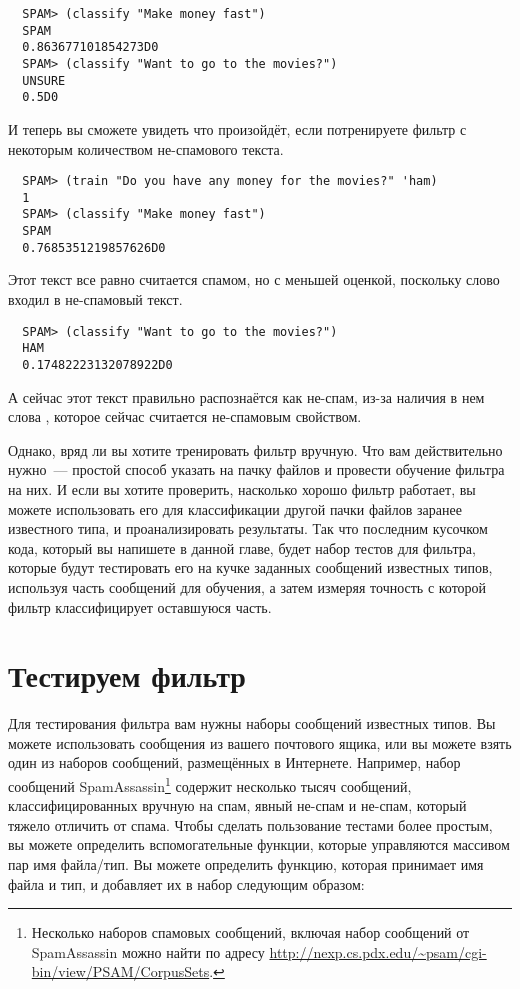 \begin{verbatim}
  SPAM> (classify "Make money fast")
  SPAM
  0.863677101854273D0
  SPAM> (classify "Want to go to the movies?")
  UNSURE
  0.5D0
\end{verbatim}

И теперь вы сможете увидеть что произойдёт, если потренируете фильтр с некоторым
количеством не-спамового текста.

\begin{verbatim}
  SPAM> (train "Do you have any money for the movies?" 'ham)
  1
  SPAM> (classify "Make money fast")
  SPAM
  0.7685351219857626D0
\end{verbatim}

Этот текст все равно считается спамом, но с меньшей оценкой, поскольку слово 
входил в не-спамовый текст.

\begin{verbatim}
  SPAM> (classify "Want to go to the movies?")
  HAM
  0.17482223132078922D0
\end{verbatim}

А сейчас этот текст правильно распознаётся как не-спам, из-за наличия в нем слова
, которое сейчас считается не-спамовым свойством.

Однако, вряд ли вы хотите тренировать фильтр вручную.  Что вам действительно нужно~---
простой способ указать на пачку файлов и провести обучение фильтра на них.  И если вы
хотите проверить, насколько хорошо фильтр работает, вы можете использовать его для
классификации другой пачки файлов заранее известного типа, и проанализировать результаты.
Так что последним кусочком кода, который вы напишете в данной главе, будет набор тестов
для фильтра, которые будут тестировать его на кучке заданных сообщений известных типов,
используя часть сообщений для обучения, а затем измеряя точность с которой фильтр
классифицирует оставшуюся часть.

\section{Тестируем фильтр}

Для тестирования фильтра вам нужны наборы сообщений известных типов.  Вы можете
использовать сообщения из вашего почтового ящика, или вы можете взять один из наборов
сообщений, размещённых в Интернете.  Например, набор сообщений
SpamAssassin\footnote{Несколько наборов спамовых сообщений, включая набор сообщений от
  SpamAssassin можно найти по адресу
  \url{http://nexp.cs.pdx.edu/~psam/cgi-bin/view/PSAM/CorpusSets}.} содержит несколько
тысяч сообщений, классифицированных вручную на спам, явный не-спам и не-спам, который
тяжело отличить от спама.  Чтобы сделать пользование тестами более простым, вы можете
определить вспомогательные функции, которые управляются массивом пар имя файла/тип.  Вы
можете определить функцию, которая принимает имя файла и тип, и добавляет их в набор
следующим образом:

